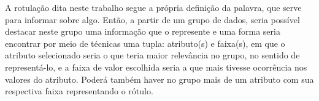 A rotulação dita neste trabalho segue a própria definição da palavra, que serve para informar sobre algo. Então, a partir de um grupo de dados, seria possível destacar neste grupo uma informação que o represente e uma forma seria encontrar por meio de técnicas uma tupla: atributo(s) e faixa(s), em que o atributo selecionado seria o que teria maior relevância no grupo, no sentido de representá-lo, e a faixa de valor escolhida seria a que mais tivesse ocorrência nos valores do atributo. Poderá também haver no grupo mais de um atributo com sua respectiva faixa representando o rótulo. 

% 
% 
% 

